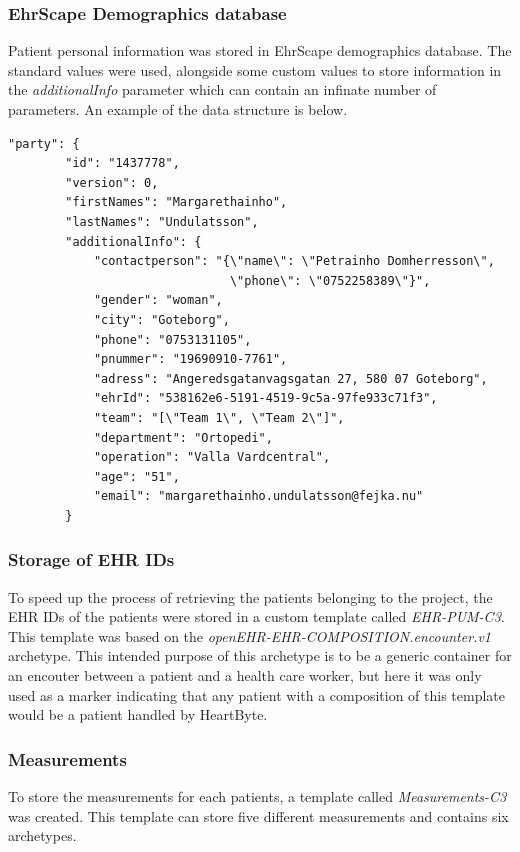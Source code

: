 \documentclass{article}
\begin{document}
\subsubsection{EhrScape Demographics database}
Patient personal information was stored in EhrScape demographics database. The standard values were used, alongside some custom values to store information in the \emph{additionalInfo} parameter which can contain an infinate number of parameters. An example of the data structure is below.

\begin{lstlisting}
"party": {
        "id": "1437778",
        "version": 0,
        "firstNames": "Margarethainho",
        "lastNames": "Undulatsson",
        "additionalInfo": {
            "contactperson": "{\"name\": \"Petrainho Domherresson\",
                               \"phone\": \"0752258389\"}",
            "gender": "woman",
            "city": "Goteborg",
            "phone": "0753131105",
            "pnummer": "19690910-7761",
            "adress": "Angeredsgatanvagsgatan 27, 580 07 Goteborg",
            "ehrId": "538162e6-5191-4519-9c5a-97fe933c71f3",
            "team": "[\"Team 1\", \"Team 2\"]",
            "department": "Ortopedi",
            "operation": "Valla Vardcentral",
            "age": "51",
            "email": "margarethainho.undulatsson@fejka.nu"
        }
\end{lstlisting}

\subsubsection{Storage of EHR IDs}
To speed up the process of retrieving the patients belonging to the project, the EHR IDs of the patients were stored in a custom template called \emph{EHR-PUM-C3}. This template was based on the \emph{openEHR-EHR-COMPOSITION.encounter.v1} archetype. This intended purpose of this archetype is to be a generic container for an encouter between a patient and a health care worker, but here it was only used as a marker indicating that any patient with a composition of this template would be a patient handled by HeartByte.

\subsubsection{Measurements}
To store the measurements for each patients, a template called \emph{Measurements-C3} was created. This template can store five different measurements and contains six archetypes.
\end{document}

